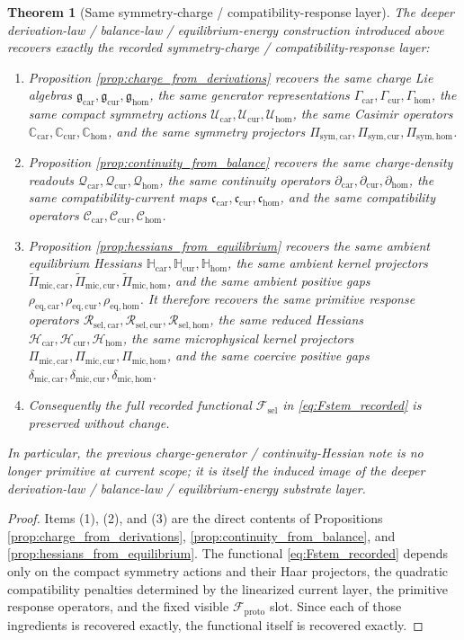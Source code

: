 \documentclass[11pt]{article}
\newcommand{\ProtoFunctional}{\mathscr F_{\mathrm{proto}}}
\newcommand{\StemFunctional}{\mathscr F_{\mathrm{sel}}}
\newcommand{\UltraCarProj}{\Pi_{\mathrm{mic,car}}}
\newcommand{\UltraCurProj}{\Pi_{\mathrm{mic,cur}}}
\newcommand{\UltraHomProj}{\Pi_{\mathrm{mic,hom}}}
\newcommand{\UltraCarGap}{\delta_{\mathrm{mic,car}}}
\newcommand{\UltraCurGap}{\delta_{\mathrm{mic,cur}}}
\newcommand{\UltraHomGap}{\delta_{\mathrm{mic,hom}}}
\newcommand{\TensorSymProj}{\Pi_{\mathrm{sym,car}}}
\newcommand{\CurSymProj}{\Pi_{\mathrm{sym,cur}}}
\newcommand{\HomSymProj}{\Pi_{\mathrm{sym,hom}}}
\newcommand{\TensorCompat}{\mathcal C_{\mathrm{car}}}
\newcommand{\CurCompat}{\mathcal C_{\mathrm{cur}}}
\newcommand{\HomCompat}{\mathcal C_{\mathrm{hom}}}
\newcommand{\TensorHess}{\mathcal H_{\mathrm{car}}}
\newcommand{\CurHess}{\mathcal H_{\mathrm{cur}}}
\newcommand{\HomHess}{\mathcal H_{\mathrm{hom}}}
\newcommand{\TensorSymAct}{\mathscr U_{\mathrm{car}}}
\newcommand{\CurSymAct}{\mathscr U_{\mathrm{cur}}}
\newcommand{\HomSymAct}{\mathscr U_{\mathrm{hom}}}
\newcommand{\TensorCurrent}{\mathfrak c_{\mathrm{car}}}
\newcommand{\CurCurrent}{\mathfrak c_{\mathrm{cur}}}
\newcommand{\HomCurrent}{\mathfrak c_{\mathrm{hom}}}
\newcommand{\TensorResp}{\mathcal R_{\mathrm{sel,car}}}
\newcommand{\CurResp}{\mathcal R_{\mathrm{sel,cur}}}
\newcommand{\HomResp}{\mathcal R_{\mathrm{sel,hom}}}
\newcommand{\TensorChargeAlg}{\mathfrak g_{\mathrm{car}}}
\newcommand{\CurChargeAlg}{\mathfrak g_{\mathrm{cur}}}
\newcommand{\HomChargeAlg}{\mathfrak g_{\mathrm{hom}}}
\newcommand{\TensorGen}{\Gamma_{\mathrm{car}}}
\newcommand{\CurGen}{\Gamma_{\mathrm{cur}}}
\newcommand{\HomGen}{\Gamma_{\mathrm{hom}}}
\newcommand{\TensorCasimir}{\mathbb C_{\mathrm{car}}}
\newcommand{\CurCasimir}{\mathbb C_{\mathrm{cur}}}
\newcommand{\HomCasimir}{\mathbb C_{\mathrm{hom}}}
\newcommand{\TensorDensity}{\mathcal Q_{\mathrm{car}}}
\newcommand{\CurDensity}{\mathcal Q_{\mathrm{cur}}}
\newcommand{\HomDensity}{\mathcal Q_{\mathrm{hom}}}
\newcommand{\TensorCont}{\partial_{\mathrm{car}}}
\newcommand{\CurCont}{\partial_{\mathrm{cur}}}
\newcommand{\HomCont}{\partial_{\mathrm{hom}}}
\newcommand{\TensorAmbientHess}{\mathbb H_{\mathrm{car}}}
\newcommand{\CurAmbientHess}{\mathbb H_{\mathrm{cur}}}
\newcommand{\HomAmbientHess}{\mathbb H_{\mathrm{hom}}}
\newcommand{\TensorEqKerProj}{\widetilde\Pi_{\mathrm{mic,car}}}
\newcommand{\CurEqKerProj}{\widetilde\Pi_{\mathrm{mic,cur}}}
\newcommand{\HomEqKerProj}{\widetilde\Pi_{\mathrm{mic,hom}}}
\newcommand{\EqCarGap}{\rho_{\mathrm{eq,car}}}
\newcommand{\EqCurGap}{\rho_{\mathrm{eq,cur}}}
\newcommand{\EqHomGap}{\rho_{\mathrm{eq,hom}}}
\newtheorem{theorem}{Theorem}
\begin{document}
\begin{theorem}[Same symmetry-charge / compatibility-response layer]
\label{thm:same_layer}
The deeper derivation-law / balance-law / equilibrium-energy construction introduced above recovers exactly the recorded symmetry-charge / compatibility-response layer:
\begin{enumerate}
    \item Proposition \ref{prop:charge_from_derivations} recovers the same charge Lie algebras \(\TensorChargeAlg,\CurChargeAlg,\HomChargeAlg\), the same generator representations \(\TensorGen,\CurGen,\HomGen\), the same compact symmetry actions \(\TensorSymAct,\CurSymAct,\HomSymAct\), the same Casimir operators \(\TensorCasimir,\CurCasimir,\HomCasimir\), and the same symmetry projectors \(\TensorSymProj,\CurSymProj,\HomSymProj\).
    \item Proposition \ref{prop:continuity_from_balance} recovers the same charge-density readouts \(\TensorDensity,\CurDensity,\HomDensity\), the same continuity operators \(\TensorCont,\CurCont,\HomCont\), the same compatibility-current maps \(\TensorCurrent,\CurCurrent,\HomCurrent\), and the same compatibility operators \(\TensorCompat,\CurCompat,\HomCompat\).
    \item Proposition \ref{prop:hessians_from_equilibrium} recovers the same ambient equilibrium Hessians \(\TensorAmbientHess,\CurAmbientHess,\HomAmbientHess\), the same ambient kernel projectors \(\TensorEqKerProj,\CurEqKerProj,\HomEqKerProj\), and the same ambient positive gaps \(\EqCarGap,\EqCurGap,\EqHomGap\). It therefore recovers the same primitive response operators \(\TensorResp,\CurResp,\HomResp\), the same reduced Hessians \(\TensorHess,\CurHess,\HomHess\), the same microphysical kernel projectors \(\UltraCarProj,\UltraCurProj,\UltraHomProj\), and the same coercive positive gaps \(\UltraCarGap,\UltraCurGap,\UltraHomGap\).
    \item Consequently the full recorded functional \(\StemFunctional\) in \eqref{eq:Fstem_recorded} is preserved without change.
\end{enumerate}
In particular, the previous charge-generator / continuity-Hessian note is no longer primitive at current scope; it is itself the induced image of the deeper derivation-law / balance-law / equilibrium-energy substrate layer.
\end{theorem}

\begin{proof}
Items (1), (2), and (3) are the direct contents of Propositions \ref{prop:charge_from_derivations}, \ref{prop:continuity_from_balance}, and \ref{prop:hessians_from_equilibrium}. The functional \eqref{eq:Fstem_recorded} depends only on the compact symmetry actions and their Haar projectors, the quadratic compatibility penalties determined by the linearized current layer, the primitive response operators, and the fixed visible \(\ProtoFunctional\) slot. Since each of those ingredients is recovered exactly, the functional itself is recovered exactly.
\end{proof}
\end{document}
